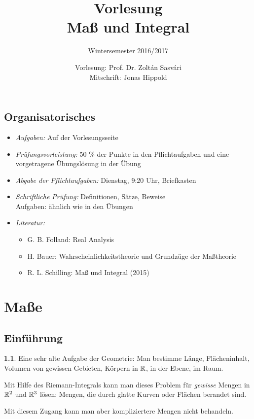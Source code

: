 \documentclass[
 a4paper,
 12pt,
 parskip=half
 ]{scrreprt}
\title{Vorlesung\\Maß und Integral}
\subtitle{Wintersemester 2016/2017}
\author{Vorlesung: Prof. Dr. Zoltán Sasvári\\Mitschrift: Jonas Hippold}
\theoremstyle{plain}
\theoremstyle{definition}
\newtheorem{exmp}[thm]{} %
\numberwithin{equation}{section}
\begin{document}
\maketitle

\tableofcontents

\section*{Organisatorisches}
 \begin{itemize}
  \item \emph{Aufgaben:} Auf der Vorlesungsseite
  \item \emph{Prüfungsvorleistung:} 50 \% der Punkte in den Pflichtaufgaben und eine vorgetragene Übungslösung in der Übung
  \item \emph{Abgabe der Pflichtaufgaben:} Dienstag, 9:20 Uhr, Briefkasten 
  \item \emph{Schriftliche Prüfung:} Definitionen, Sätze, Beweise \\
   Aufgaben: ähnlich wie in den Übungen
  \item \emph{Literatur:}
   \begin{itemize}
    \item G. B. Folland: Real Analysis
    \item H. Bauer: Wahrscheinlichkeitstheorie und Grundzüge der Maßtheorie
    \item R. L. Schilling: Maß und Integral (2015)
   \end{itemize}
 \end{itemize}

\chapter{Maße}
\section{Einführung}
\begin{exmp}
 Eine sehr alte Aufgabe der Geometrie: Man bestimme Länge, Flächeninhalt, Volumen von gewissen Gebieten, Körpern in $\mathbb{R}$, in der Ebene, im Raum.
 
 Mit Hilfe des Riemann-Integrals kann man dieses Problem für \emph{gewisse} Mengen in $\mathbb{R}^2$ und $\mathbb{R}^3$ lösen: Mengen, die durch glatte Kurven oder Flächen berandet sind.
 
 Mit diesem Zugang kann man aber kompliziertere Mengen nicht behandeln.
\end{exmp}
 
\end{document}
